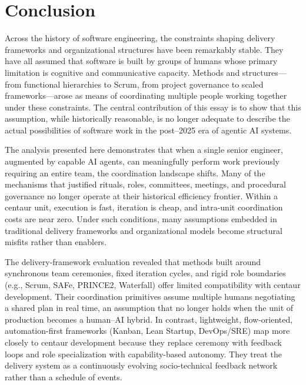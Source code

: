 \documentclass[11pt, a4paper, twocolumn]{article} %
\begin{document}
\newpage

\section*{Conclusion}
\label{sec:conclusion}

Across the history of software engineering, the constraints shaping delivery
frameworks and organizational structures have been remarkably stable. They have
all assumed that software is built by groups of humans whose primary limitation
is cognitive and communicative capacity. Methods and structures---from functional
hierarchies to Scrum, from project governance to scaled frameworks---arose as
means of coordinating multiple people working together under these constraints.
The central contribution of this essay is to show that this assumption, while
historically reasonable, is no longer adequate to describe the actual
possibilities of software work in the post–2025 era of agentic AI systems.

The analysis presented here demonstrates that when a single senior engineer,
augmented by capable AI agents, can meaningfully perform work previously
requiring an entire team, the coordination landscape shifts. Many of the
mechanisms that justified rituals, roles, committees, meetings, and procedural
governance no longer operate at their historical efficiency frontier. Within a
centaur unit, execution is fast, iteration is cheap, and intra-unit coordination
costs are near zero. Under such conditions, many assumptions embedded in
traditional delivery frameworks and organizational models become structural
misfits rather than enablers.

The delivery-framework evaluation revealed that methods built around synchronous
team ceremonies, fixed iteration cycles, and rigid role boundaries (e.g.,
Scrum, SAFe, PRINCE2, Waterfall) offer limited compatibility with centaur
development. Their coordination primitives assume multiple humans negotiating a
shared plan in real time, an assumption that no longer holds when the unit of
production becomes a human–AI hybrid. In contrast, lightweight, flow-oriented,
automation-first frameworks (Kanban, Lean Startup, DevOps/SRE) map more closely
to centaur development because they replace ceremony with feedback loops and
role specialization with capability-based autonomy. They treat the delivery
system as a continuously evolving socio-technical feedback network rather than a
schedule of events.
\end{document}
